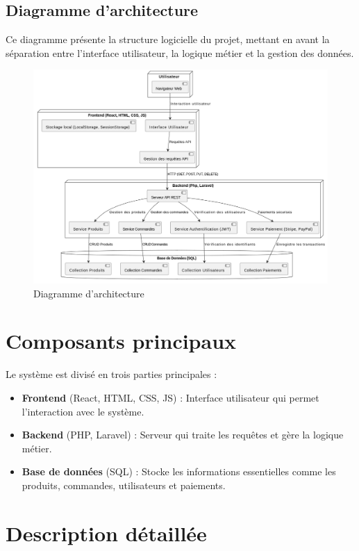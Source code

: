 \documentclass[a4paper,12pt]{article}
\begin{document}
\subsection{Diagramme d’architecture}
Ce diagramme présente la structure logicielle du projet, mettant en avant la séparation entre l’interface utilisateur, la logique métier et la gestion des données.
\begin{figure}
    \centering
    \includegraphics[width=\textwidth]{out/diagrammes/archi3.png}
    \caption{Diagramme d'architecture}
\end{figure}

\section{Composants principaux}
Le système est divisé en trois parties principales :
\begin{itemize}
    \item \textbf{Frontend} (React, HTML, CSS, JS) : Interface utilisateur qui permet l’interaction avec le système.
    \item \textbf{Backend} (PHP, Laravel) : Serveur qui traite les requêtes et gère la logique métier.
    \item \textbf{Base de données} (SQL) : Stocke les informations essentielles comme les produits, commandes, utilisateurs et paiements.
\end{itemize}

\section{Description détaillée}
\end{document}
